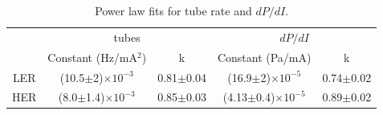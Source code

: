 \begin{table}
	\centering
	\begin{tabular}{ ccccc }
		&	\multicolumn{2}{c}{\He tubes}	& \multicolumn{2}{c}{$dP/dI$}					\\
  		& Constant (Hz/mA$^2$) 			& k		& Constant (Pa/mA) 		& k		\\\hline \hline
	LER	& (10.5$\pm$2)$\times10^{-3}$		& 0.81$\pm$0.04	& (16.9$\pm$2)$\times10^{-5}$	& 0.74$\pm$0.02	\\ 
	HER	& (8.0$\pm$1.4)$\times10^{-3}$		& 0.85$\pm$0.03	& (4.13$\pm$0.4)$\times10^{-5}$	& 0.89$\pm$0.02	\\ \hline

	\end{tabular}
	\caption[Power law fits for \he tube rate and $dP/dI$]{Power law fits for \he tube rate and $dP/dI$.}
	\label{tab:PowerLawFits}
\end{table}





























